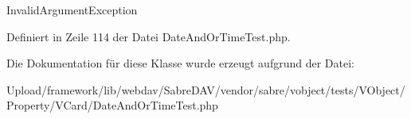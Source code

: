 Invalid\+Argument\+Exception 

Definiert in Zeile 114 der Datei Date\+And\+Or\+Time\+Test.\+php.



Die Dokumentation für diese Klasse wurde erzeugt aufgrund der Datei\+:\begin{DoxyCompactItemize}
\item 
Upload/framework/lib/webdav/\+Sabre\+D\+A\+V/vendor/sabre/vobject/tests/\+V\+Object/\+Property/\+V\+Card/Date\+And\+Or\+Time\+Test.\+php\end{DoxyCompactItemize}

